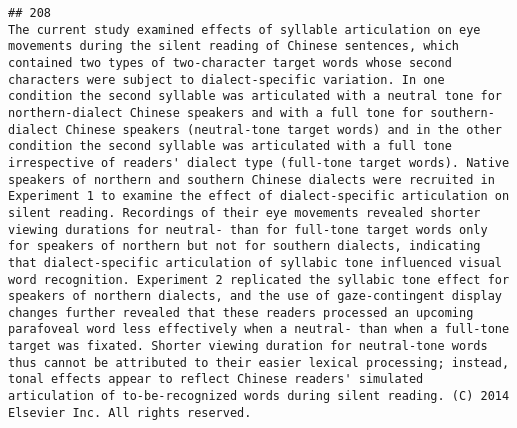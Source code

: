 \documentclass[
  english,
  man]{apa6}
\begin{document}
\begin{verbatim}
## 208                                                                                                                                                                                                                                                                                                                                                                                                                                                                                                                                                                                                                                                                                                                                                                                                                                                                                                                                                                                                                  The current study examined effects of syllable articulation on eye movements during the silent reading of Chinese sentences, which contained two types of two-character target words whose second characters were subject to dialect-specific variation. In one condition the second syllable was articulated with a neutral tone for northern-dialect Chinese speakers and with a full tone for southern-dialect Chinese speakers (neutral-tone target words) and in the other condition the second syllable was articulated with a full tone irrespective of readers' dialect type (full-tone target words). Native speakers of northern and southern Chinese dialects were recruited in Experiment 1 to examine the effect of dialect-specific articulation on silent reading. Recordings of their eye movements revealed shorter viewing durations for neutral- than for full-tone target words only for speakers of northern but not for southern dialects, indicating that dialect-specific articulation of syllabic tone influenced visual word recognition. Experiment 2 replicated the syllabic tone effect for speakers of northern dialects, and the use of gaze-contingent display changes further revealed that these readers processed an upcoming parafoveal word less effectively when a neutral- than when a full-tone target was fixated. Shorter viewing duration for neutral-tone words thus cannot be attributed to their easier lexical processing; instead, tonal effects appear to reflect Chinese readers' simulated articulation of to-be-recognized words during silent reading. (C) 2014 Elsevier Inc. All rights reserved.

\end{verbatim}
\end{document}
